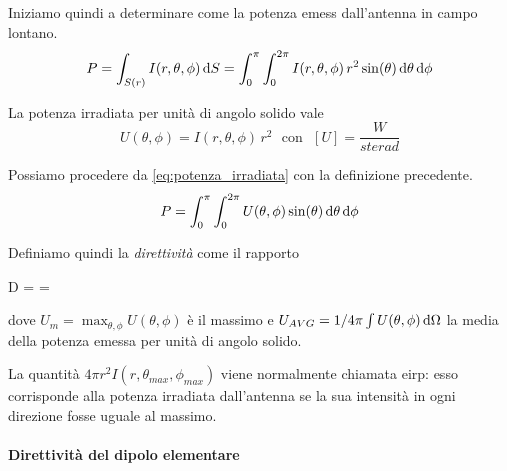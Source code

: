 Iniziamo quindi a determinare come la potenza emess dall'antenna in campo lontano.
\begin{equation} \label{eq:potenza_irradiata}
	P= \int_{S(r)} I(r,\theta,\phi) \mathop{}\!\mathrm{d} S =\int_0^\pi\int_0^{2\pi} I(r,\theta,\phi) \, r^2 \sin(\theta) \mathop{}\!\mathrm{d} \theta \mathop{}\!\mathrm{d} \phi
\end{equation}

La potenza irradiata per unità di angolo solido vale
\begin{equation*}
	U(\theta,\phi) = I(r,\theta,\phi) \, r^2
	\text{~ con ~}
	[U] = \frac{W}{sterad}
\end{equation*}


Possiamo procedere da \autoref{eq:potenza_irradiata} con la definizione precedente.
\begin{equation}
	P = \int_0^\pi \int_0^{2\pi} U(\theta,\phi) \sin(\theta) \mathop{}\!\mathrm{d} \theta \mathop{}\!\mathrm{d} \phi
\end{equation}

Definiamo quindi la \emph{direttività} come il rapporto
\begin{esp}\label{eq:dirett}
	D
	= 
	= 
\end{esp}
dove $U_m = \max_{\theta,\phi} U(\theta,\phi)$ è il massimo e $U_{AVG} = 1/{4\pi} \int U(\theta,\phi) \mathop{}\!\mathrm{d} \Omega$ la media della potenza emessa per unità di angolo solido.

La quantità $4\pi r^2 I(r,\theta_{max},\phi_{max})$ viene normalmente chiamata \gls{eirp}: esso corrisponde alla potenza irradiata dall'antenna se la sua intensità in ogni direzione fosse uguale al massimo.

\paragraph{Direttività del dipolo elementare}

